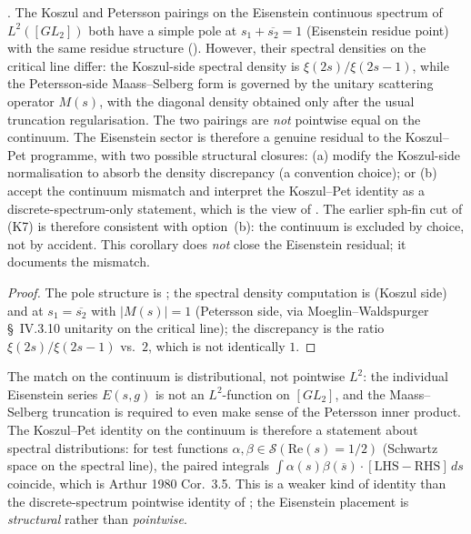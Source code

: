 \begin{corollary}
\label{v4-arith:kms-gns:cor:eisenstein-final}
\ClaimStatusConditional. The Koszul and Petersson pairings on the
Eisenstein continuous spectrum of \(L^{2}([GL_{2}])\) both have a
simple pole at \(s_{1}+\overline{s_{2}}=1\) (Eisenstein residue
point) with the same residue structure
(). However,
their spectral densities on the critical line differ: the
Koszul-side spectral density is \(\xi(2s)/\xi(2s-1)\), while the
Petersson-side Maass--Selberg form is governed by the unitary
scattering operator \(M(s)\), with the diagonal density obtained only
after the usual truncation regularisation. The two pairings are
\emph{not} pointwise equal on the continuum. The Eisenstein sector
is therefore a genuine residual to the Koszul--Pet programme, with
two possible structural closures: (a) modify the Koszul-side
normalisation to absorb the density discrepancy (a convention
choice); or (b) accept the continuum mismatch and interpret the
Koszul--Pet identity as a discrete-spectrum-only statement, which
is the view of .
The earlier sph-fin cut of (K7) is
therefore consistent with option~(b): the continuum is excluded by
choice, not by accident. This corollary does \emph{not} close the
Eisenstein residual; it documents the mismatch.
\end{corollary}

\begin{proof}
The pole structure is
; the spectral
density computation is
 (Koszul side) and
 at \(s_{1}=\overline{s_{2}}\)
with \(|M(s)|=1\) (Petersson side, via Moeglin--Waldspurger
\S~IV.3.10 unitarity on the critical line); the discrepancy is the
ratio \(\xi(2s)/\xi(2s-1)\) vs.~\(2\), which is not identically \(1\).
\end{proof}

\begin{remark}
\label{v4-arith:kms-gns:rem:continuum-honest-domain}
The match on the continuum is distributional, not pointwise
\(L^{2}\): the individual Eisenstein series \(E(s,g)\) is not an
\(L^{2}\)-function on \([GL_{2}]\), and the Maass--Selberg truncation
is required to even make sense of the Petersson inner product.
The Koszul--Pet identity on the continuum is therefore a statement
about spectral distributions: for test functions
\(\alpha,\beta\in\mathcal{S}(\mathrm{Re}(s)=1/2)\) (Schwartz space on
the spectral line), the paired integrals
\(\int\alpha(s)\beta(\overline{s})\cdot[\text{LHS}-\text{RHS}]\,ds\)
coincide, which is Arthur 1980 Cor.~3.5. This is a weaker kind of
identity than the discrete-spectrum pointwise identity of
;
the Eisenstein placement is \emph{structural} rather than
\emph{pointwise}.
\end{remark}

